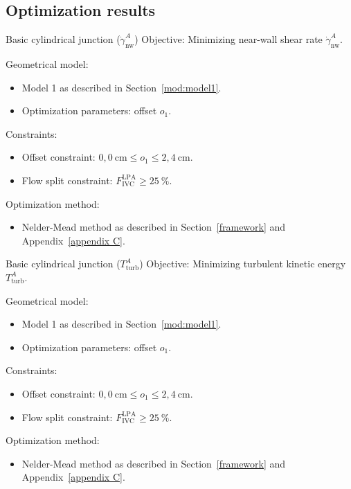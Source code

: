 \newpage
\subsection{Optimization results}
\begin{optimproblem}{Basic cylindrical junction ($\dot{\gamma}^{A}_{\text{nw}}$)}
	\vspace{2mm}
	Objective:  Minimizing near-wall shear rate $\dot{\gamma}^{A}_{\text{nw}}$.
	
	\vspace{2mm}
	Geometrical model:
	\begin{itemize}
		\item Model 1 as described in Section~\ref{mod:model1}.
		\item Optimization parameters: offset $o_1$.
	\end{itemize}
	Constraints:
	\begin{itemize}
		\item Offset constraint: $0{,}0~\text{cm} \leq o_1 \leq 2{,}4~\text{cm}$.
		\item Flow split constraint: $F^{\text{LPA}}_{\text{IVC}} \geq 25~\%$.
	\end{itemize}
	Optimization method:
	\begin{itemize}
		\item Nelder-Mead method as described in Section~\ref{framework} and Appendix~\ref{appendix C}.
	\end{itemize}
	\label{optimprob:1}
\end{optimproblem}
\newpage

\begin{optimproblem}{Basic cylindrical junction ($T^{A}_{\mathrm{turb}}$)}
	\vspace{2mm}
	Objective: Minimizing turbulent kinetic energy $T^{A}_{\mathrm{turb}}$.
	
	\vspace{2mm}
	Geometrical model:
	\begin{itemize}
		\item Model 1 as described in Section~\ref{mod:model1}.
		\item Optimization parameters: offset $o_1$.
	\end{itemize}
	Constraints:
	\begin{itemize}
		\item Offset constraint: $0{,}0~\text{cm} \leq o_1 \leq 2{,}4~\text{cm}$.
		\item Flow split constraint: $F^{\text{LPA}}_{\text{IVC}} \geq 25~\%$.
	\end{itemize}
	Optimization method:
	\begin{itemize}
		\item Nelder-Mead method as described in Section~\ref{framework} and Appendix~\ref{appendix C}.
	\end{itemize}
	\label{optimprob:2}
\end{optimproblem}
\newpage


